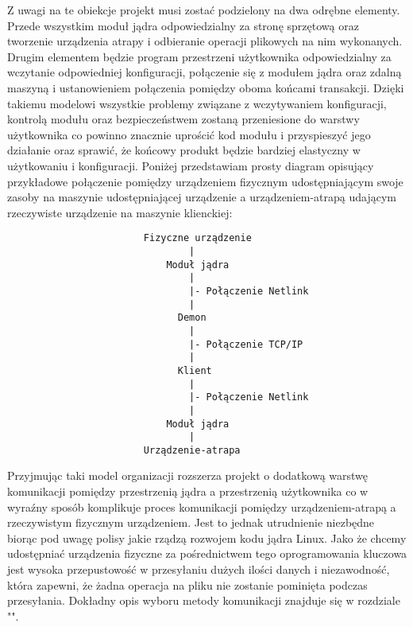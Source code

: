 \documentclass[10pt]{article}
\begin{document}
Z uwagi na te obiekcje projekt musi zostać podzielony na dwa odrębne elementy. Przede wszystkim moduł jądra odpowiedzialny za stronę sprzętową oraz tworzenie urządzenia atrapy i odbieranie operacji plikowych na nim wykonanych. Drugim elementem będzie program przestrzeni użytkownika odpowiedzialny za wczytanie odpowiedniej konfiguracji, połączenie się z modułem jądra oraz zdalną maszyną i ustanowieniem połączenia pomiędzy oboma końcami transakcji. Dzięki takiemu modelowi wszystkie problemy związane z wczytywaniem konfiguracji, kontrolą modułu oraz bezpieczeństwem zostaną przeniesione do warstwy użytkownika co powinno znacznie uprościć kod modułu i przyspieszyć jego działanie oraz sprawić, że końcowy produkt będzie bardziej elastyczny w użytkowaniu i konfiguracji. Poniżej przedstawiam prosty diagram opisujący przykładowe połączenie pomiędzy urządzeniem fizycznym udostępniającym swoje zasoby na maszynie udostępniającej urządzenie a urządzeniem-atrapą udającym rzeczywiste urządzenie na maszynie klienckiej:

\begin{verbatim}
                        Fizyczne urządzenie
                                |
                            Moduł jądra
                                |
                                |- Połączenie Netlink
                                |
                              Demon
                                |
                                |- Połączenie TCP/IP
                                |
                              Klient
                                |
                                |- Połączenie Netlink
                                |
                            Moduł jądra
                                |
                        Urządzenie-atrapa
\end{verbatim}

Przyjmując taki model organizacji rozszerza projekt o dodatkową warstwę komunikacji pomiędzy przestrzenią jądra a przestrzenią użytkownika co w wyraźny sposób komplikuje proces komunikacji pomiędzy urządzeniem-atrapą a rzeczywistym fizycznym urządzeniem. Jest to jednak utrudnienie niezbędne biorąc pod uwagę polisy jakie rządzą rozwojem kodu jądra Linux. Jako że chcemy udostępniać urządzenia fizyczne za pośrednictwem tego oprogramowania kluczowa jest wysoka przepustowość w przesyłaniu dużych ilości danych i niezawodność, która zapewni, że żadna operacja na pliku nie zostanie pominięta podczas przesyłania. Dokładny opis wyboru metody komunikacji znajduje się w rozdziale "".
\end{document}
